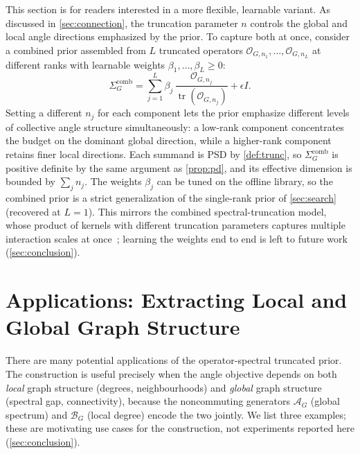 \documentclass[aps,prresearch,reprint,amsmath,amssymb,floatfix,nofootinbib,superscriptaddress,longbibliography]{revtex4-2}
\theoremstyle{remark}
\newcommand{\calO}{\mathcal{O}}
\newcommand{\calA}{\mathcal{A}}
\newcommand{\calB}{\mathcal{B}}
\begin{document}
This section is for readers interested in a more flexible, learnable variant.  As
discussed in \cref{sec:connection}, the truncation parameter \(n\) controls the
global and local angle directions emphasized by the prior.  To capture both at
once, consider a combined prior assembled from \(L\) truncated operators
\(\calO_{G,n_1},\ldots,\calO_{G,n_L}\) at different ranks with learnable weights
\(\beta_1,\ldots,\beta_L\ge0\):
\begin{equation}
    \Sigma_G^{\mathrm{comb}}
    =\sum_{j=1}^{L}\beta_j\,\frac{\calO_{G,n_j}}{\operatorname{tr}(\calO_{G,n_j})}
    +\epsilon I .
    \label{eq:combined}
\end{equation}
Setting a different \(n_j\) for each component lets the prior emphasize different
levels of collective angle structure simultaneously: a low-rank component
concentrates the budget on the dominant global direction, while a higher-rank
component retains finer local directions.  Each summand is PSD by
\cref{def:trunc}, so \(\Sigma_G^{\mathrm{comb}}\) is positive definite by the same
argument as \cref{prop:pd}, and its effective dimension is bounded by
\(\sum_j n_j\).  The weights \(\beta_j\) can be tuned on the offline library, so
the combined prior is a strict generalization of the single-rank prior of
\cref{sec:search} (recovered at \(L{=}1\)).  This mirrors the combined
spectral-truncation model, whose product of kernels with different truncation
parameters captures multiple interaction scales at once~\cite{hashimoto2024spectral};
learning the weights end to end is left to future work (\cref{sec:conclusion}).

\section{Applications: Extracting Local and Global Graph Structure}
\label{sec:applications}

There are many potential applications of the operator-spectral truncated prior.
The construction is useful precisely when the angle objective depends on both
\emph{local} graph structure (degrees, neighbourhoods) and \emph{global} graph
structure (spectral gap, connectivity), because the noncommuting generators
\(\calA_G\) (global spectrum) and \(\calB_G\) (local degree) encode the two
jointly.  We list three examples; these are motivating use cases for the
construction, not experiments reported here (\cref{sec:conclusion}).
\end{document}
